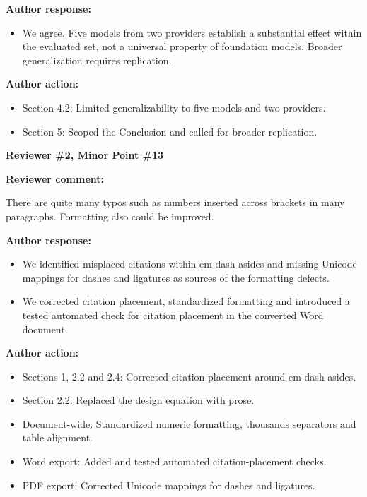 \documentclass[11pt]{article}
\newcommand{\rvcomment}[1]{{\color{ReviewerGreen}#1}}
\newcommand{\concern}[1]{\textbf{\color{ReviewerGreen}#1}}
\begin{document}
\textbf{Author response:}

\begin{itemize}

\item We agree. Five models from two providers establish a substantial effect within the evaluated set, not a universal property of foundation models. Broader generalization requires replication.

\end{itemize}

\textbf{Author action:}

\begin{itemize}

\item Section 4.2: Limited generalizability to five models and two providers.

\item Section 5: Scoped the Conclusion and called for broader replication.

\end{itemize}

\vspace{12pt}
\concern{Reviewer \#2, Minor Point \#13}

\concern{Reviewer comment:}

\rvcomment{There are quite many typos such as numbers inserted across brackets in many paragraphs. Formatting also could be improved.}

\textbf{Author response:}

\begin{itemize}

\item We identified misplaced citations within em-dash asides and missing Unicode mappings for dashes and ligatures as sources of the formatting defects.

\item We corrected citation placement, standardized formatting and introduced a tested automated check for citation placement in the converted Word document.

\end{itemize}

\textbf{Author action:}

\begin{itemize}

\item Sections 1, 2.2 and 2.4: Corrected citation placement around em-dash asides.

\item Section 2.2: Replaced the design equation with prose.

\item Document-wide: Standardized numeric formatting, thousands separators and table alignment.

\item Word export: Added and tested automated citation-placement checks.

\item PDF export: Corrected Unicode mappings for dashes and ligatures.

\end{itemize}
\end{document}

